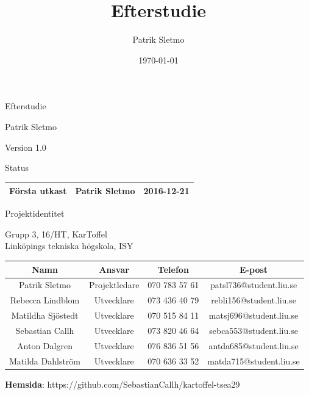 \documentclass{article}
\title{Efterstudie}
\author{Patrik Sletmo}
\date{\today}
\begin{document}
\thispagestyle{empty}

{
\sffamily
\centering
\large


{\huge 
Efterstudie
}

{\large
Patrik Sletmo
}

{\large
Version 1.0
}

\vspace{3.5cm}

Status
\begin{table}[H]
\centering
\begin{tabular}{ | c | c | c | }
\hline
Första utkast & Patrik Sletmo & 2016-12-21 \\
\hline
\end{tabular}
\end{table}
}
\clearpage

\vspace*{\fill}
{
\sffamily
\centering
\large


{\huge
Projektidentitet
}

{\large
Grupp 3, 16/HT, KarToffel \\ Linköpings tekniska högskola, ISY
}

\vspace{0.5cm}

\begin{table}[H]
\centering
\begin{tabular}{ | c | c | c | c |}
\hline
Namn & Ansvar & Telefon & E-post \\
\hline
Patrik Sletmo & Projektledare & 070 783 57 61 & patsl736@student.liu.se \\
\hline
Rebecca Lindblom & Utvecklare & 073 436 40 79 & rebli156@student.liu.se \\
\hline
Matildha Sjöstedt & Utvecklare & 070 515 84 11 & matsj696@student.liu.se \\
\hline
Sebastian Callh & Utvecklare & 073 820 46 64 & sebca553@student.liu.se \\
\hline
Anton Dalgren & Utvecklare & 076 836 51 56 & antda685@student.liu.se \\
\hline
Matilda Dahlström & Utvecklare & 070 636 33 52 & matda715@student.liu.se \\
\hline
\end{tabular}
\end{table}
}

\begin{center}
\textbf{Hemsida}: https://github.com/SebastianCallh/kartoffel-tsea29
\end{center}
\end{document}
